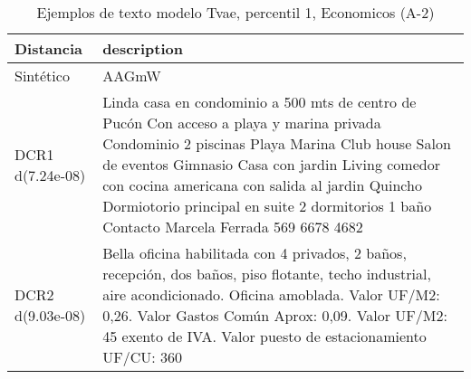 \begin{table}[H]
\centering
\fontsize{10}{14}\selectfont
\caption{Ejemplos de texto modelo Tvae, percentil 1, Economicos (A-2)}
\label{table-example-economicos-a-2-tvae-1p-text}
\begin{tabular}{|l|m{35em}|}
\hline
\rowcolor[gray]{0.8}
Distancia & description \\
\hline Sintético & AAGmW \\
\hline DCR1 d(7.24e-08) & Linda casa en condominio a 500 mts de centro de Puc\'on Con acceso a playa y marina privada  Condominio 2 piscinas Playa Marina Club house Salon de eventos Gimnasio   Casa con jardin  Living comedor con cocina americana con salida al jardin Quincho Dormiotorio principal en suite 2 dormitorios 1 ba\~no  Contacto Marcela Ferrada 569 6678 4682 \\
\hline DCR2 d(9.03e-08) & Bella oficina habilitada con 4 privados, 2 ba\~nos, recepci\'on, dos ba\~nos, piso flotante, techo industrial, aire acondicionado. Oficina amoblada.  Valor UF/M2: 0,26. Valor Gastos Com\'un Aprox: 0,09.  Valor UF/M2: 45 exento de IVA. Valor puesto de estacionamiento UF/CU: 360 \\
\hline
\end{tabular}
\end{table}
